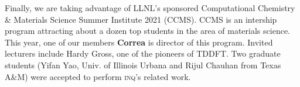 Finally, we are taking advantage of LLNL's sponsored Computational Chemistry \& Materials Science Summer Institute 2021 (CCMS).
CCMS is an intership program attracting about a dozen top students in the area of materials science.
This year, one of our members {\bf Correa} is director of this program.
Invited lecturers include Hardy Gross, one of the pioneers of TDDFT.
Two graduate students (Yifan Yao, Univ. of Illinois Urbana and Rijul Chauhan from Texas A\&M) were accepted to perform \textsc{inq}'s related work.

\clearpage


